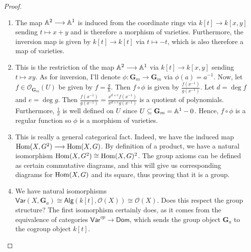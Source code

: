 \begin{proof}
    \begin{enumerate}[label = (\alph*)]
        \item The map $\mathbb A^2 \longrightarrow \mathbb A^1$ is induced from the coordinate rings via $k[t] \longrightarrow k[x, y]$ sending $t \mapsto x + y$ and is therefore a morphism of varieties. Furthermore, the inversion map is given by $k[t] \longrightarrow k[t]$ via $t \mapsto -t$, which is also therefore a map of varieties.

        \item This is the restriction of the map $\mathbb A^2 \longrightarrow \mathbb A^1$ via $k[t] \longrightarrow k[x, y]$ sending $t \mapsto xy$. As for inversion, I'll denote $\phi: \mathbf G_m \longrightarrow \mathbf G_m$ via $\phi(a) = a^{-1}$. Now, let $f \in \mathcal O_{\mathbf{G}_m}(U)$ be given by $f = \frac{g}{h}$. Then $f \circ \phi$ is given by $\frac{f(x^{-1})}{g(x^{-1})}$. Let $d = \deg f$ and $e = \deg g$. Then $\frac{f(x^{-1})}{g(x^{-1})} = \frac{x^{d+e} f(x^{-1})}{x^{d+e} g(x^{-1})}$ is a quotient of polynomials. Furthermore, $\frac{1}{x}$ is well defined on $U$ since $U \subseteq \mathbf G_m = \mathbb A^1 - 0$. Hence, $f \circ \phi$ is a regular function so $\phi$ is a morphism of varieties.

        \item This is really a general categorical fact. Indeed, we have the induced map $\operatorname{Hom}(X, G^2) \longrightarrow \operatorname{Hom}(X, G)$. By definition of a product, we have a natural isomorphism $\operatorname{Hom}(X, G^2) \cong \operatorname{Hom}(X, G)^2$. The group axioms can be defined as certain commutative diagrams, and this will give us corresponding diagrams for $\operatorname{Hom}(X, G)$ and its square, thus proving that it is a group.

        \item We have natural isomorphisms $\mathsf{Var}(X, \mathbf G_a) \cong \mathsf{Alg}(k[t], \mathcal O(X)) \cong \mathcal O(X)$. Does this respect the group structure? The first isomorphism certainly does, as it comes from the equivalence of categories $\mathsf{Var}^{op} \longrightarrow \mathsf{Dom}$, which sends the group object $\mathbf G_a$ to the cogroup object $k[t]$.
        

\end{enumerate}
\end{proof}
